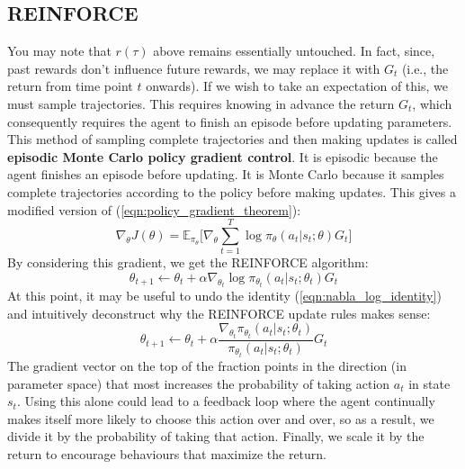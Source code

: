 \documentclass[journal, onecolumn, 12pt, draftclsnofoot]{IEEEtran}
\numberwithin{equation}{section}
\newcommand{\kword}[1]{\textbf{#1}}
\begin{document}
	\subsection{REINFORCE}
	\par You may note that $r(\tau)$ above remains essentially untouched. In fact, since, past rewards don't influence future rewards, we may replace it with $G_t$ (i.e., the return from time point $t$ onwards). If we wish to take an expectation of this, we must sample trajectories. This requires knowing in advance the return $G_t$, which consequently requires the agent to finish an episode before updating parameters. This method of sampling complete trajectories and then making updates is called \kword{episodic Monte Carlo policy gradient control}. It is episodic because the agent finishes an episode before updating. It is Monte Carlo because it samples complete trajectories according to the policy before making updates. This gives a modified version of (\ref{eqn:policy_gradient_theorem}):
	\begin{equation}
		\label{eqn:policy_gradient_theorem_G_t}
		\nabla_\theta J(\theta) = \mathbb{E}_{\pi_\theta} \bigg[ \nabla_\theta \sum_{t=1}^T \log \pi_\theta (a_t \vert s_t; \theta) G_t \bigg]
	\end{equation}
	 By considering this gradient, we get the REINFORCE algorithm:
	\begin{equation}
		\label{eqn:REINFORCE}
		\theta_{t+1} \gets \theta_{t} + \alpha \nabla_{\theta_t} \log \pi_{\theta_t}(a_t \vert s_t; \theta_t) G_t
	\end{equation}
	At this point, it may be useful to undo the identity (\ref{eqn:nabla_log_identity}) and intuitively deconstruct why the REINFORCE update rules makes sense:
	$$\theta_{t+1} \gets \theta_{t} + \alpha  \frac{\nabla_{\theta_t} \pi_{\theta_t}(a_t \vert s_t; \theta_t)}{\pi_{\theta_t}(a_t \vert s_t; \theta_t)} G_t$$
	The gradient vector on the top of the fraction points in the direction (in parameter space) that most increases the probability of taking action $a_t$ in state $s_t$. Using this alone could lead to a feedback loop where the agent continually makes itself more likely to choose this action over and over, so as a result, we divide it by the probability of taking that action. Finally, we scale it by the return to encourage behaviours that maximize the return.
\end{document}
